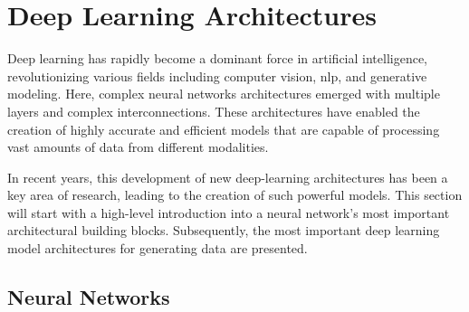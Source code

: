 \section{Deep Learning Architectures}
\label{ch:preliminaries-deepLearningArchitectures}

Deep learning has rapidly become a dominant force in artificial intelligence, revolutionizing various fields including computer vision, \gls{nlp}, and generative modeling. 
Here, complex neural networks architectures emerged with multiple layers and complex interconnections.
These architectures have enabled the creation of highly accurate and efficient models that are capable of processing vast amounts of data from different modalities.

In recent years, this development of new deep-learning architectures has been a key area of research, leading to the creation of such powerful models.
This section will start with a high-level introduction into a neural network's most important architectural building blocks.
Subsequently, the most important deep learning model architectures for generating data are presented.

\subsection{Neural Networks}
\label{ch:preliminaries-deepLearningArchitectures-neuralNetworks}

